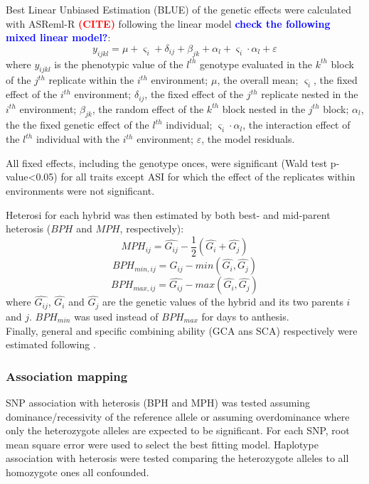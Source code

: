 \documentclass[10pt]{article}
\newcommand{\sme}[1]{\textcolor{red}{\bf #1}}
\newcommand{\yang}[1]{\textcolor{blue}{\bf #1}}
\begin{document}
Best Linear Unbiased Estimation (BLUE) of the genetic effects were calculated with ASReml-R \sme{(CITE)} following the linear model \yang{check the following mixed linear model?}: 
%
\[y_{ijkl} = \mu + \varsigma_{i} + \delta_{ij} + \beta_{jk} + \alpha_{l} +  \varsigma_{i} \cdot \alpha_{l} + \varepsilon\]
%
where 
$y_{ijkl}$ is the phenotypic value of the $l^{th}$ genotype evaluated in the $k^{th}$ block of the $j^{th}$ replicate within the $i^{th}$ environment; 
$\mu$, the overall mean; 
$\varsigma_{i}$, the fixed effect of the $i^{th}$ environment;
$\delta_{ij}$, the fixed effect of the $j^{th}$ replicate nested in the $i^{th}$ environment; 
$\beta_{jk}$, the random effect of the $k^{th}$ block nested in the $j^{th}$ block; 
$\alpha_{l}$, the the fixed genetic effect  of the $l^{th}$ individual; 
$\varsigma_{i} \cdot \alpha_{l}$, the interaction effect of the $l^{th}$ individual with the $i^{th}$ environment; 
$\varepsilon$, the model residuals.

All fixed effects, including the genotype onces, were significant (Wald test p-value<0.05) for all traits except ASI for which the effect of the replicates within environments were not significant.

Heterosi for each hybrid was then estimated by both best- and mid-parent heterosis ($BPH$ and $MPH$, respectively):
%
\[ MPH_{ij}=\hat{G_{ij}}-\frac{1}{2}(\hat{G_{i}}+\hat{G_{j}}) \]
\[ BPH_{min,ij}=\hat{G_{ij}}-min(\hat{G_{i}} ,\hat{G_{j}}) \] 
\[ BPH_{max,ij}=\hat{G_{ij}}-max(\hat{G_{i}} ,\hat{G_{j}}) \]
%
where $\hat{G_{ij}}$, $\hat{G_{i}}$ and $\hat{G_{j}}$ are the genetic values of the hybrid and its two parents $i$ and $j$. $BPH_{min}$ was used instead of $BPH_{max}$ for days to anthesis.\\

Finally, general and specific combining ability (GCA ans SCA) respectively were estimated following \citet{Falconer1996}.

\subsubsection*{Association mapping}
SNP association with heterosis (BPH and MPH) was tested assuming dominance/recessivity of the reference allele or assuming overdominance where only the heterozygote alleles are expected to be significant. For each SNP, root mean square error were used to select the best fitting model. 
Haplotype association with heterosis were tested comparing the heterozygote alleles to all homozygote ones all confounded. 
\end{document}
